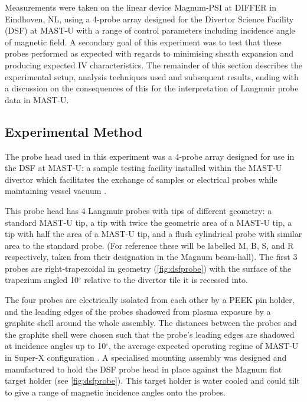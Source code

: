 \documentclass[a4paper, 11pt]{article} %
\begin{document}
	Measurements were taken on the linear device Magnum-PSI at DIFFER in Eindhoven, NL, using a 4-probe array designed for the Divertor Science Facility (DSF) at MAST-U with a range of control parameters including incidence angle of magnetic field. 
	A secondary goal of this experiment was to test that these probes performed as expected with regards to minimising sheath expansion and producing expected IV characteristics.
	The remainder of this section describes the experimental setup, analysis techniques used and subsequent results, ending with a discussion on the consequences of this for the interpretation of Langmuir probe data in MAST-U.

\subsection{Experimental Method}
	The probe head used in this experiment was a 4-probe array designed for use in the DSF at MAST-U: a sample testing facility installed within the MAST-U divertor which facilitates the exchange of samples or electrical probes while maintaining vessel vacuum \cite{Elmore2012}.
	 
	This probe head has 4 Langmuir probes with tips of different geometry: a standard MAST-U tip, a tip with twice the geometric area of a MAST-U tip, a tip with half the area of a MAST-U tip, and a flush cylindrical probe with similar area to the standard probe. 
	(For reference these will be labelled M, B, S, and R respectively, taken from their designation in the Magnum beam-hall). 
	The first 3 probes are right-trapezoidal in geometry (\cref{fig:dsfprobe}) with the surface of the trapezium angled 10$^{\circ}$ relative to the divertor tile it is recessed into.

	The four probes are electrically isolated from each other by a PEEK pin holder, and the leading edges of the probes shadowed from plasma exposure by a graphite shell around the whole assembly. 
	The distances between the probes and the graphite shell were chosen such that the probe's leading edges are shadowed at incidence angles up to 10$^{\circ}$, the average expected operating regime of MAST-U in Super-X configuration \cite{Harrison}.	
	A specialised mounting assembly was designed and manufactured to hold the DSF probe head in place against the Magnum flat target holder (see \cref{fig:dsfprobe}).
	This target holder is water cooled and could tilt to give a range of magnetic incidence angles onto the probes.
	
\end{document}
